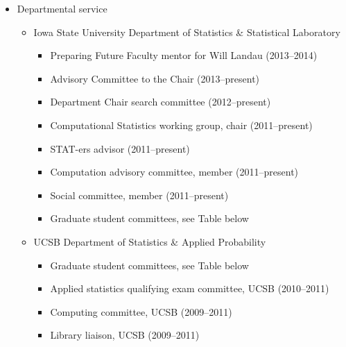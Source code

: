 \documentclass[overlapped,line]{res}
\begin{document}
\begin{resume}
\begin{itemize}
\item Departmental service
 	\begin{itemize}
	\item Iowa State University Department of Statistics \& Statistical Laboratory
		\begin{itemize}
		\item Preparing Future Faculty mentor for Will Landau (2013--2014)
		\item Advisory Committee to the Chair (2013--present)
		\item Department Chair search committee (2012--present)
		\item Computational Statistics working group, chair (2011--present)
		\item STAT-ers advisor (2011--present)
		\item Computation advisory committee, member (2011--present)
		\item Social committee, member (2011--present)
		\item Graduate student committees, see Table below
		\end{itemize}
	\item UCSB Department of Statistics \& Applied Probability
		\begin{itemize}
		\item Graduate student committees, see Table below
		\item Applied statistics qualifying exam committee, UCSB (2010--2011)
		\item Computing committee, UCSB (2009--2011)
		\item Library liaison, UCSB (2009--2011)
		\end{itemize}
 	\end{itemize}
\end{itemize}

	    \begin{center}
		
		\end{center}



\end{resume}
\end{document}
